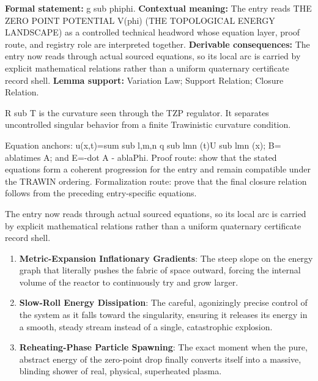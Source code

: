 \begingroup\footnotesize\setlength{\emergencystretch}{3em}\sloppy
\textbf{Formal statement:} g sub phiphi. \textbf{Contextual meaning:} The entry reads THE ZERO POINT POTENTIAL V(phi) (THE TOPOLOGICAL ENERGY LANDSCAPE) as a controlled technical headword whose equation layer, proof route, and registry role are interpreted together. \textbf{Derivable consequences:} The entry now reads through actual sourced equations, so its local arc is carried by explicit mathematical relations rather than a uniform quaternary certificate record shell. \textbf{Lemma support:} Variation Law; Support Relation; Closure Relation.\par
\endgroup

R sub T is the curvature seen through the TZP regulator. It separates uncontrolled singular behavior from a finite Trawinistic curvature condition.

Equation anchors: u(x,t)=sum sub l,m,n q sub lmn (t)U sub lmn (x); B= ablatimes A; and E=-dot A - ablaPhi. Proof route: show that the stated equations form a coherent progression for the entry and remain compatible under the TRAWIN ordering. Formalization route: prove that the final closure relation follows from the preceding entry-specific equations.

The entry now reads through actual sourced equations, so its local arc is carried by explicit mathematical relations rather than a uniform quaternary certificate record shell.
\endgroup

\begin{enumerate}[leftmargin=1.6em,itemsep=6pt,topsep=4pt]
\item \textbf{Metric-Expansion Inflationary Gradients}: The steep slope on the energy graph that literally pushes the fabric of space outward, forcing the internal volume of the reactor to continuously try and grow larger.
\item \textbf{Slow-Roll Energy Dissipation}: The careful, agonizingly precise control of the system as it falls toward the singularity, ensuring it releases its energy in a smooth, steady stream instead of a single, catastrophic explosion.
\item \textbf{Reheating-Phase Particle Spawning}: The exact moment when the pure, abstract energy of the zero-point drop finally converts itself into a massive, blinding shower of real, physical, superheated plasma.
\end{enumerate}

